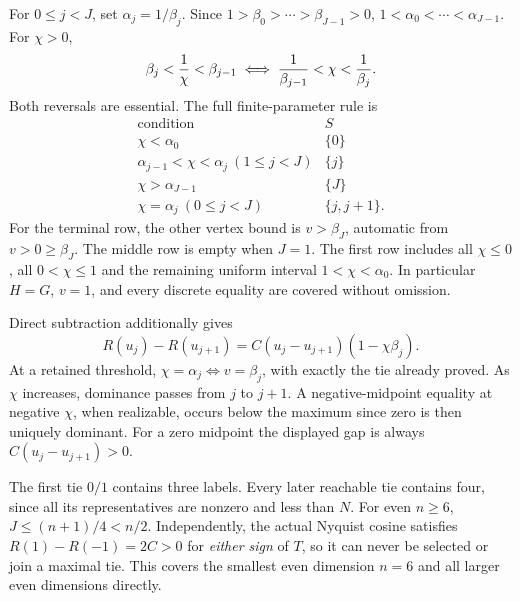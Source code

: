\documentclass[11pt]{article}
\begin{document}
For $0\le j<J$, set $\alpha_j=1/\beta_j$. Since
$1>\beta_0>\cdots>\beta_{J-1}>0$,
$1<\alpha_0<\cdots<\alpha_{J-1}$. For $\chi>0$,
\[
 \beta_j<{1\over\chi}<\beta_{j-1}
 \iff {1\over\beta_{j-1}}<\chi<{1\over\beta_j}.
\]
Both reversals are essential. The full finite-parameter rule is
\begin{equation}
\begin{array}{c|c}
\text{condition}&S\\\hline
\chi<\alpha_0&\{0\}\\
\alpha_{j-1}<\chi<\alpha_j\ (1\le j<J)&\{j\}\\
\chi>\alpha_{J-1}&\{J\}\\
\chi=\alpha_j\ (0\le j<J)&\{j,j+1\}.
\end{array} \label{a05:cells}
\end{equation}
For the terminal row, the other vertex bound is $v>\beta_J$, automatic
from $v>0\ge\beta_J$. The middle row is empty when $J=1$.
The first row includes all $\chi\le0$, all $0<\chi\le1$ and the
remaining uniform interval $1<\chi<\alpha_0$. In particular
$H=G$, $v=1$, and every discrete equality are covered without omission.

Direct subtraction additionally gives
\[
 R(u_j)-R(u_{j+1})=C(u_j-u_{j+1})(1-\chi\beta_j).
\]
At a retained threshold, $\chi=\alpha_j\iff v=\beta_j$, with exactly
the tie already proved. As $\chi$ increases, dominance passes from
$j$ to $j+1$. A negative-midpoint equality at negative $\chi$, when
realizable, occurs below the maximum since zero is then uniquely dominant.
For a zero midpoint the displayed gap is always $C(u_j-u_{j+1})>0$.

The first tie $0/1$ contains three labels. Every later reachable tie
contains four, since all its representatives are nonzero and less than
$N$. For even $n\ge6$, $J\le(n+1)/4<n/2$. Independently, the actual
Nyquist cosine satisfies $R(1)-R(-1)=2C>0$ for \emph{either sign} of
$T$, so it can never be selected or join a maximal tie. This covers the
smallest even dimension $n=6$ and all larger even dimensions directly.
\end{document}
